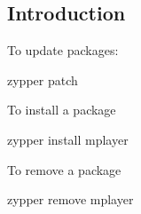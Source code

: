 
\subsection{Introduction}

To update packages:

zypper patch

To install a package

zypper install mplayer

To remove a package

zypper remove mplayer
